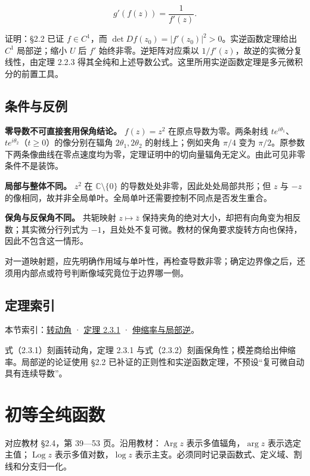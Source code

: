 \documentclass[11pt,a4paper]{article}
\begin{document}
\[
g'(f(z))=\frac1{f'(z)}.
\]

证明：§2.2 已证 \(f\in C^1\)，而
\(\det Df(z_0)=|f'(z_0)|^2>0\)。实逆函数定理给出 \(C^1\) 局部逆；缩小
\(U\) 后 \(f'\) 始终非零。逆矩阵对应乘以
\(1/f'(z)\)，故逆的实微分复线性，由定理 2.2.3
得其全纯和上述导数公式。这里所用实逆函数定理是多元微积分的前置工具。

\subsection{条件与反例}\label{ch02-s3-ux6761ux4ef6ux4e0eux53cdux4f8b}

\textbf{零导数不可直接套用保角结论。} \(f(z)=z^2\)
在原点导数为零。两条射线
\(te^{i\theta_1}\)、\(te^{i\theta_2}\)（\(t\ge0\)）的像分别在辐角
\(2\theta_1,2\theta_2\) 的射线上；例如夹角 \(\pi/4\) 变为
\(\pi/2\)。原参数下两条像曲线在零点速度均为零，定理证明中的切向量辐角无定义。由此可见非零条件不是装饰。

\textbf{局部与整体不同。} \(z^2\) 在 \(\mathbb C\setminus\{0\}\)
的导数处处非零，因此处处局部共形；但 \(z\) 与 \(-z\)
的像相同，故并非全局单叶。全局单叶还需要控制不同点是否发生重合。

\textbf{保角与反保角不同。} 共轭映射 \(z\mapsto\bar z\)
保持夹角的绝对大小，却把有向角变为相反数；其实微分行列式为
\(-1\)，且处处不复可微。教材的保角要求旋转方向也保持，因此不包含这一情形。

对一道映射题，应先明确作用域与单叶性，再检查导数非零；确定边界像之后，还须用内部点或符号判断像域究竟位于边界哪一侧。

\subsection{定理索引}\label{ch02-s3-ux5b9aux7406ux7d22ux5f15}

本节索引：\hyperref[ch02-s3-ux8f6cux52a8ux89d2]{转动角} ·
\hyperref[ch02-s3-ux4fddux89d2ux5b9aux7406]{定理 2.3.1} ·
\hyperref[ch02-s3-ux4f38ux7f29ux7387ux4e0eux5c40ux90e8ux5171ux5f62]{伸缩率与局部逆}。

式（2.3.1）刻画转动角，定理 2.3.1
与式（2.3.2）刻画保角性；模差商给出伸缩率。局部逆的论证使用 §2.2
已补证的正则性和实逆函数定理，不预设``复可微自动具有连续导数''。

\section{初等全纯函数}
对应教材 §2.4，第 39---53 页。沿用教材：\(\operatorname{Arg}z\)
表示多值辐角，\(\arg z\) 表示选定主值；\(\operatorname{Log}z\)
表示多值对数，\(\log z\)
表示主支。必须同时记录函数式、定义域、割线和分支归一化。
\end{document}
